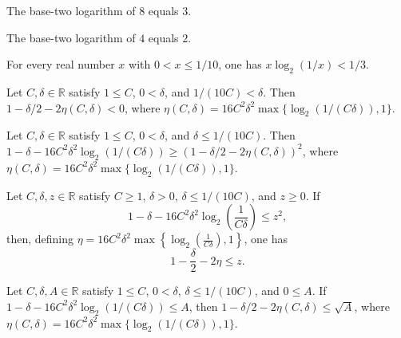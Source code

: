 \begin{theorem}
\label{FABL.logb_two_eight}
\leanok
{}
The base-two logarithm of $8$ equals $3$.
\end{theorem}

\begin{theorem}
\label{FABL.logb_two_four}
\leanok
{}
The base-two logarithm of $4$ equals $2$.
\end{theorem}

\begin{theorem}
\label{FABL.mul_logb_two_inv_lt_one_third}
\leanok
{}
For every real number $x$ with $0<x\le1/10$, one has $x\log_2(1/x)<1/3$.
\end{theorem}

\begin{theorem}
\label{FABL.exercise5_38a}
\leanok
{}
Let $C,\delta\in\mathbb R$ satisfy $1\le C$, $0<\delta$, and $1/(10C)<\delta$. Then
$1-\delta/2-2\eta(C,\delta)<0$, where
$\eta(C,\delta)=16C^2\delta^2\max\{\log_2(1/(C\delta)),1\}$.
\end{theorem}

\begin{theorem}
\label{FABL.exercise5_38b}
\leanok
{}
Let $C,\delta\in\mathbb R$ satisfy $1\le C$, $0<\delta$, and $\delta\le 1/(10C)$. Then
$1-\delta-16C^2\delta^2\log_2(1/(C\delta))\ge (1-\delta/2-2\eta(C,\delta))^2$, where
$\eta(C,\delta)=16C^2\delta^2\max\{\log_2(1/(C\delta)),1\}$.
\end{theorem}

\begin{theorem}
\label{FABL.exercise5_38_nonnegative_lower_bound}
\leanok
{}
Let $C,\delta,z\in\mathbb R$ satisfy $C\ge1$, $\delta>0$, $\delta\le1/(10C)$, and
$z\ge0$. If
\[
1-\delta-16C^2\delta^2\log_2\!\left(\frac1{C\delta}\right)\le z^2,
\]
then, defining
$\eta=16C^2\delta^2\max\!\left\{\log_2\!\left(\frac1{C\delta}\right),1\right\}$, one has
\[
1-\frac{\delta}{2}-2\eta\le z.
\]
\end{theorem}

\begin{theorem}
\label{FABL.exercise5_38_sqrt_lower_bound}
\leanok
{}
Let $C,\delta,A\in\mathbb R$ satisfy $1\le C$, $0<\delta$, $\delta\le 1/(10C)$, and
$0\le A$. If $1-\delta-16C^2\delta^2\log_2(1/(C\delta))\le A$, then
$1-\delta/2-2\eta(C,\delta)\le\sqrt A$, where
$\eta(C,\delta)=16C^2\delta^2\max\{\log_2(1/(C\delta)),1\}$.
\end{theorem}
